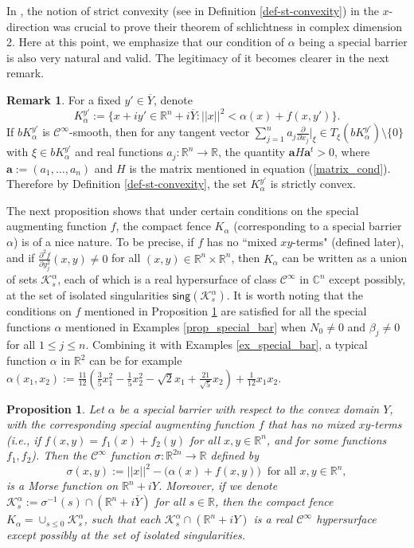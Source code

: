 \documentclass[12pt,reqno, a4paper]{amsart}
\newtheorem{proposition}[theorem]{Proposition}
\theoremstyle{definition}
\newtheorem{remark}[theorem]{Remark}
\theoremstyle{definition}
\numberwithin{equation}{section}
\def\R{\mathbb{R}}                              %
\def\C{\mathbb{C}}                              %
\begin{document}
In \cite{haz-por}, the notion of strict convexity (see in Definition \ref{def-st-convexity}) in the $x$-direction was crucial to prove their theorem of schlichtness in complex dimension 2. Here at this point, we emphasize that our condition of $\alpha$ being a special barrier is also very natural and valid. The legitimacy of it becomes clearer in the next remark. 


\begin{remark}\label{remark_strcvx}
For a fixed $y'\in \overline{Y} $, denote $$K_{\alpha}^{y'}:=\{x+iy' \in \R^n+i \overline{Y} : ||x||^2< \alpha(x)+f(x,y')\}.$$ If $bK_{\alpha}^{y'}$ is $\mathcal{C}^{\infty}$-smooth, then for any tangent vector ${\sum_{j=1}^{n} a_j \frac{\partial}{\partial x_j}\Big|_{\xi} \in T_{\xi}(b K_{\alpha}^{y'})\setminus \{0\}}$ with $\xi\in bK_{\alpha}^{y'}$ 
and real functions $a_j:\R^n\to \R$, the quantity $\textbf{a} H\textbf{a}^t>0$, where $\textbf{a}:=(a_1,\ldots, a_n)$ and $H$ is the matrix mentioned in equation (\ref{matrix_cond}). 
Therefore by Definition \ref{def-st-convexity}, the set $K_{\alpha}^{y'}$ is strictly convex. 
\end{remark}

 
The next proposition shows that under certain conditions on the special augmenting function $f$, the compact fence $K_{\alpha}$ (corresponding to a special barrier $\alpha$) is of a nice nature. To be precise, if $f$ has no ``mixed $xy$-terms" (defined later), and if $\frac{\partial^2 f}{\partial y_j^2}(x,y)\neq 0$ for all $(x,y)\in \R^n\times \R^n$, then $K_{\alpha}$ can be written as a union of sets $\mathcal{K}_{s}^{\alpha}$, each of which is a real hypersurface of class $\mathcal{C}^{\infty}$ in $\C^n$ except possibly, at the set of isolated singularities $\textsf{sing}(\mathcal{K}_{s}^{\alpha})$. It is worth noting that the conditions on $f$ mentioned in Proposition \ref{lem_crit} are satisfied for all the special functions $\alpha$ mentioned in Examples \ref{prop_special_bar} when $N_0\neq 0$ and $\beta_j\neq 0$ for all $1\leq j\leq n.$ Combining it with Examples \ref{ex_special_bar}, a typical function $\alpha$ in $\R^2$ can be for example $\alpha(x_1,x_2):=\frac{11}{12}(\frac{3}{5}x_1^2-\frac{1}{5}x_2^2-\sqrt{2}x_1+\frac{21}{\sqrt{5}}x_2)+\frac{1}{12}x_1x_2.$

\begin{proposition}\label{lem_crit}
	Let $\alpha$ be a special barrier with respect to the convex domain $Y$, with the corresponding special augmenting function $f$ that has no mixed $xy$-terms (i.e., if ${f(x,y)=f_1(x)+f_2(y)}$ for all $x,y\in \R^n$, and for some functions $f_1,f_2$). %
	Then the $\mathcal{C}^{\infty}$ function $\sigma:\R^{2n}\to \R$ defined by  $$\sigma(x,y):=||x||^2-\big(\alpha(x)+f(x,y)\big) ~\text{ for all } x, y\in \R^n,$$ is a Morse function on $\R^n+iY$. Moreover, if we denote $\mathcal{K}_{s}^{\alpha}:=\sigma^{-1}(s)\cap(\R^n+i\overline{Y})$ for all $s\in \R$, then the compact fence $K_{\alpha}=\cup_{s\leq 0}\mathcal{K}_{s}^{\alpha}$, such that each $\mathcal{K}_{s}^{\alpha}\cap(\R^n+iY)$ is a real $\mathcal{C}^{\infty}$ hypersurface except possibly at the set of isolated singularities. 
\end{proposition}
\end{document}
